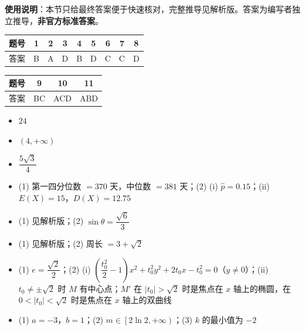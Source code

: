 
\begin{gknotice}
\textbf{使用说明}：本节只给最终答案便于快速核对，完整推导见解析版。答案为编写者独立推导，\textbf{非官方标准答案}。
\end{gknotice}

\begin{center}\begin{tabular}{ccccccccc}
\toprule
题号 & 1 & 2 & 3 & 4 & 5 & 6 & 7 & 8 \\
\midrule
答案 & B & A & D & B & D & C & C & D \\
\bottomrule
\end{tabular}\end{center}

\begin{center}\begin{tabular}{cccc}
\toprule
题号 & 9 & 10 & 11 \\
\midrule
答案 & BC & ACD & ABD \\
\bottomrule
\end{tabular}\end{center}

\begin{itemize}[leftmargin=2.6em]
  \item[\textbf{12.}] $24$
  \item[\textbf{13.}] $(4,+\infty)$
  \item[\textbf{14.}] $\dfrac{5\sqrt{3}}{4}$
\end{itemize}

\begin{itemize}[leftmargin=2.6em]
  \item[\textbf{15.}] (1) 第一四分位数 $=370$ 天，中位数 $=381$ 天；(2) (i) $\hat p=0.15$；(ii) $E(X)=15$，$D(X)=12.75$
  \item[\textbf{16.}] (1) 见解析版；(2) $\sin\theta=\dfrac{\sqrt6}{3}$
  \item[\textbf{17.}] (1) 见解析版；(2) 周长 $=3+\sqrt2$
  \item[\textbf{18.}] (1) $e=\dfrac{\sqrt2}{2}$；(2) (i) $\left(\dfrac{t_0^2}{2}-1\right)x^2+t_0^2y^2+2t_0x-t_0^2=0$（$y\ne0$）；(ii) $t_0\ne\pm\sqrt2$ 时 $M$ 有中心点；$M'$ 在 $\left|t_0\right|>\sqrt2$ 时是焦点在 $x$ 轴上的椭圆，在 $0<\left|t_0\right|<\sqrt2$ 时是焦点在 $x$ 轴上的双曲线
  \item[\textbf{19.}] (1) $a=-3$，$b=1$；(2) $m\in\left[2\ln2,+\infty\right)$；(3) $k$ 的最小值为 $-2$
\end{itemize}
